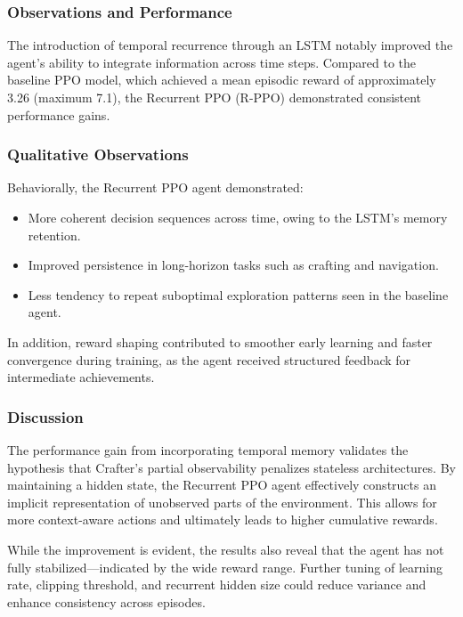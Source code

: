 \documentclass[twocolumn]{article}
\begin{document}
\subsubsection*{Observations and Performance}
The introduction of temporal recurrence through an LSTM notably improved the agent's ability to integrate information across time steps. Compared to the baseline PPO model, which achieved a mean episodic reward of approximately 3.26 (maximum 7.1), the Recurrent PPO (R-PPO) demonstrated consistent performance gains.

\subsubsection*{Qualitative Observations}

Behaviorally, the Recurrent PPO agent demonstrated:
\begin{itemize}
    \item More coherent decision sequences across time, owing to the LSTM's memory retention.
    \item Improved persistence in long-horizon tasks such as crafting and navigation.
    \item Less tendency to repeat suboptimal exploration patterns seen in the baseline agent.
\end{itemize}

In addition, reward shaping contributed to smoother early learning and faster convergence during training, as the agent received structured feedback for intermediate achievements.

\subsubsection*{Discussion}

The performance gain from incorporating temporal memory validates the hypothesis that Crafter's partial observability penalizes stateless architectures. By maintaining a hidden state, the Recurrent PPO agent effectively constructs an implicit representation of unobserved parts of the environment. This allows for more context-aware actions and ultimately leads to higher cumulative rewards. 

While the improvement is evident, the results also reveal that the agent has not fully stabilized—indicated by the wide reward range. Further tuning of learning rate, clipping threshold, and recurrent hidden size could reduce variance and enhance consistency across episodes.
\end{document}
